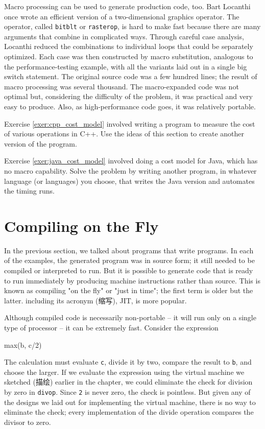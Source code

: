 Macro processing can be used to generate production code, too. Bart
Locanthi once wrote an efficient version of a two-dimensional graphics
operator. The operator, called \verb'bitblt' or \verb'rasterop', is hard to
make fast because there are many arguments that combine in complicated
ways. Through careful case analysis, Locanthi reduced the combinations to
individual loops that could be separately optimized.  Each case was then
constructed by macro substitution, analogous to the performance-testing
example, with all the variants laid out in a single big switch statement.
The original source code was a few hundred lines; the result of macro
processing was several thousand. The macro-expanded code was not optimal
but, considering the difficulty of the problem, it was practical and very
easy to produce. Also, as high-performance code goes, it was relatively
portable.

\begin{exercise}
    Exercise \ref{exer:cpp_cost_model} involved writing a program to
    measure the cost of various operations in C++. Use the ideas of this
    section to create another version of the program.
\end{exercise}

\begin{exercise}
    Exercise \ref{exer:java_cost_model} involved doing a cost model for
    Java, which has no macro capability. Solve the problem by writing
    another program, in whatever language (or languages) you choose, that
    writes the Java version and automates the timing runs.
\end{exercise}

\section{Compiling on the Fly}
\label{sec:compiling_on_the_fly}

In the previous section, we talked about programs that write programs. In
each of the examples, the generated program was in source form; it still
needed to be compiled or interpreted to run. But it is possible to generate
code that is ready to run immediately by producing machine instructions
rather than source. This is known as compiling "on the fly" or "just in
time"; the first term is older but the latter. including its acronym
(缩写), JIT, is more popular.

Although compiled code is necessarily non-portable -- it will run only on a
single type of processor -- it can be extremely fast. Consider the
expression
\begin{wellcode}
    max(b, c/2)
\end{wellcode}
The calculation must evaluate \verb'c', divide it by two, compare the
result to \verb'b', and choose the larger. If we evaluate the expression
using the virtual machine we sketched (描绘) earlier in the chapter, we
could eliminate the check for division by zero in \verb'divop'.  Since
\verb'2' is never zero, the check is pointless. But given any of the
designs we laid out for implementing the virtual machine, there is no way
to eliminate the check; every implementation of the divide operation
compares the divisor to zero.

